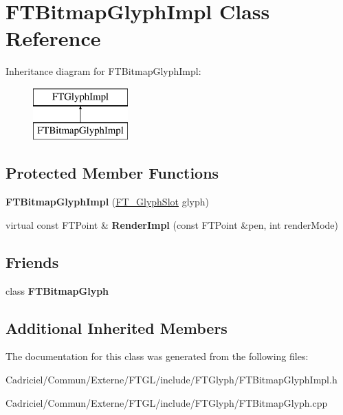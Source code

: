 \hypertarget{class_f_t_bitmap_glyph_impl}{}\section{F\+T\+Bitmap\+Glyph\+Impl Class Reference}
\label{class_f_t_bitmap_glyph_impl}
Inheritance diagram for F\+T\+Bitmap\+Glyph\+Impl\+:\begin{figure}[H]
\begin{center}
\leavevmode
\includegraphics[height=2.000000cm]{class_f_t_bitmap_glyph_impl}
\end{center}
\end{figure}
\subsection*{Protected Member Functions}
\begin{DoxyCompactItemize}
\item 
{\bfseries F\+T\+Bitmap\+Glyph\+Impl} (\hyperlink{struct_f_t___glyph_slot_rec__}{F\+T\+\_\+\+Glyph\+Slot} glyph)\hypertarget{class_f_t_bitmap_glyph_impl_a4462585cd1fc2e461ff8c6a0b49c68b3}{}\label{class_f_t_bitmap_glyph_impl_a4462585cd1fc2e461ff8c6a0b49c68b3}

\item 
virtual const F\+T\+Point \& {\bfseries Render\+Impl} (const F\+T\+Point \&pen, int render\+Mode)\hypertarget{class_f_t_bitmap_glyph_impl_a31a412b09a68489ab2e96ad4524badde}{}\label{class_f_t_bitmap_glyph_impl_a31a412b09a68489ab2e96ad4524badde}

\end{DoxyCompactItemize}
\subsection*{Friends}
\begin{DoxyCompactItemize}
\item 
class {\bfseries F\+T\+Bitmap\+Glyph}\hypertarget{class_f_t_bitmap_glyph_impl_aa3f0c28a7cfbfa0e896973476f7ed49d}{}\label{class_f_t_bitmap_glyph_impl_aa3f0c28a7cfbfa0e896973476f7ed49d}

\end{DoxyCompactItemize}
\subsection*{Additional Inherited Members}


The documentation for this class was generated from the following files\+:\begin{DoxyCompactItemize}
\item 
Cadriciel/\+Commun/\+Externe/\+F\+T\+G\+L/include/\+F\+T\+Glyph/F\+T\+Bitmap\+Glyph\+Impl.\+h\item 
Cadriciel/\+Commun/\+Externe/\+F\+T\+G\+L/include/\+F\+T\+Glyph/F\+T\+Bitmap\+Glyph.\+cpp\end{DoxyCompactItemize}
